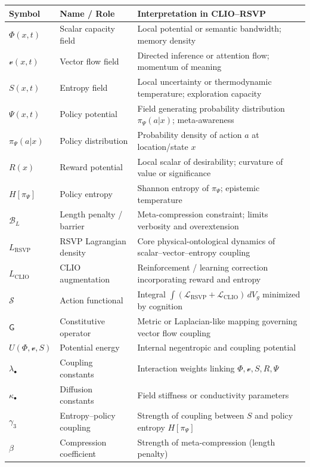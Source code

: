 \documentclass[11pt]{article}
\begin{document}
\begin{center}
\begin{tabular}{lll}
\toprule
\textbf{Symbol} & \textbf{Name / Role} & \textbf{Interpretation in CLIO–RSVP} \\
\midrule
$\Phi(x,t)$ & Scalar capacity field & Local potential or semantic bandwidth; memory density \\
$\mathcal{v}(x,t)$ & Vector flow field & Directed inference or attention flow; momentum of meaning \\
$S(x,t)$ & Entropy field & Local uncertainty or thermodynamic temperature; exploration capacity \\
$\Psi(x,t)$ & Policy potential & Field generating probability distribution $\pi_\Psi(a|x)$; meta-awareness \\
$\pi_\Psi(a|x)$ & Policy distribution & Probability density of action $a$ at location/state $x$ \\
$R(x)$ & Reward potential & Local scalar of desirability; curvature of value or significance \\
$H[\pi_\Psi]$ & Policy entropy & Shannon entropy of $\pi_\Psi$; epistemic temperature \\
$\mathcal{B}_L$ & Length penalty / barrier & Meta-compression constraint; limits verbosity and overextension \\
$L_{\mathrm{RSVP}}$ & RSVP Lagrangian density & Core physical-ontological dynamics of scalar–vector–entropy coupling \\
$L_{\mathrm{CLIO}}$ & CLIO augmentation & Reinforcement / learning correction incorporating reward and entropy \\
$\mathcal{S}$ & Action functional & Integral $\int (\mathcal{L}_{\mathrm{RSVP}}+\mathcal{L}_{\mathrm{CLIO}})\,dV_g$ minimized by cognition \\
$\mathsf{G}$ & Constitutive operator & Metric or Laplacian-like mapping governing vector flow coupling \\
$U(\Phi,\mathcal{v},S)$ & Potential energy & Internal negentropic and coupling potential \\
$\lambda_{\bullet}$ & Coupling constants & Interaction weights linking $\Phi,\mathcal{v},S,R,\Psi$ \\
$\kappa_{\bullet}$ & Diffusion constants & Field stiffness or conductivity parameters \\
$\gamma_3$ & Entropy–policy coupling & Strength of coupling between $S$ and policy entropy $H[\pi_\Psi]$ \\
$\beta$ & Compression coefficient & Strength of meta-compression (length penalty) \\

\end{tabular}
\end{center}
\end{document}
